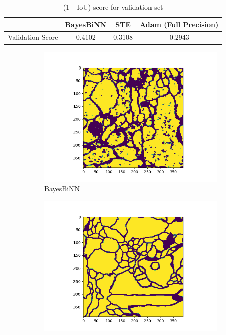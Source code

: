\begin{table}[h]
\begin{center}
\renewcommand{\arraystretch}{1.1}
\begin{tabular}{ | c | c | c | c |}
\hline
  & BayesBiNN & STE &  Adam (Full Precision) \\ \hline
    Validation Score & 0.4102 & 0.3108 & 0.2943 \\ \hline
\end{tabular}
\caption{(1 - IoU) score for validation set}
\label{tab:table5}
\end{center}
\end{table}

\begin{figure}[h]
     \centering
     \begin{subfigure}[b]{0.3\textwidth}
         \centering
         \includegraphics[width=1.3\textwidth]{../openreview/figs/output_bayesbinn.png}
         \caption{BayesBiNN}
     \end{subfigure}
     \hfill
     \begin{subfigure}[b]{0.3\textwidth}
         \centering
         \includegraphics[width=1.3\textwidth]{../openreview/figs/output_ste.png}

\end{subfigure}
\end{figure}
